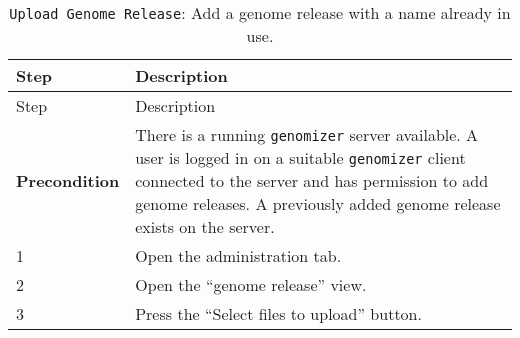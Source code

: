 \begin{longtable}[c]{@{}ll@{}}
\caption{\texttt{Upload\ Genome\ Release}: Add a genome release with a
name already in use.}\tabularnewline
\toprule
\begin{minipage}[b]{0.31\columnwidth}\raggedright\strut
Step
\strut\end{minipage} &
\begin{minipage}[b]{0.63\columnwidth}\raggedright\strut
Description
\strut\end{minipage}\tabularnewline
\midrule
\endfirsthead
\toprule
\begin{minipage}[b]{0.31\columnwidth}\raggedright\strut
Step
\strut\end{minipage} &
\begin{minipage}[b]{0.63\columnwidth}\raggedright\strut
Description
\strut\end{minipage}\tabularnewline
\midrule
\endhead
\begin{minipage}[t]{0.31\columnwidth}\raggedright\strut
\textbf{Precondition}
\strut\end{minipage} &
\begin{minipage}[t]{0.63\columnwidth}\raggedright\strut
There is a running \texttt{genomizer} server available. A user is logged
in on a suitable \texttt{genomizer} client connected to the server and
has permission to add genome releases. A previously added genome release
exists on the server.
\strut\end{minipage}\tabularnewline
\begin{minipage}[t]{0.31\columnwidth}\raggedright\strut
1
\strut\end{minipage} &
\begin{minipage}[t]{0.63\columnwidth}\raggedright\strut
Open the administration tab.
\strut\end{minipage}\tabularnewline
\begin{minipage}[t]{0.31\columnwidth}\raggedright\strut
2
\strut\end{minipage} &
\begin{minipage}[t]{0.63\columnwidth}\raggedright\strut
Open the ``genome release'' view.
\strut\end{minipage}\tabularnewline
\begin{minipage}[t]{0.31\columnwidth}\raggedright\strut
3
\strut\end{minipage} &
\begin{minipage}[t]{0.63\columnwidth}\raggedright\strut
Press the ``Select files to upload'' button.
\strut\end{minipage}\tabularnewline

\end{longtable}

